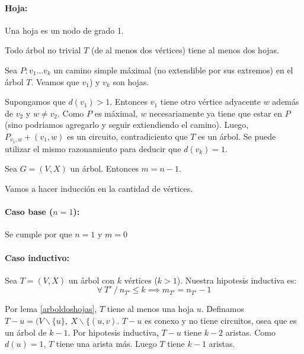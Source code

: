 \paragraph{Hoja:} Una hoja es un nodo de grado 1.

\begin{lema}\label{arboldoshojas}
	Todo árbol no trivial \(T\) (de al menos dos vértices) tiene al menos dos hojas.
\end{lema}
\begin{demo}
	Sea \(P: v_1\dots v_k\) un camino simple máximal (no extendible por sus extremos) en el árbol \(T\). Veamos que \(v_1\)) y \(v_k\) son hojas. 	
	
	Supongamos que \(d(v_1) > 1\). Entonces \(v_1\) tiene otro vértice adyacente
	 \(w\) además de \(v_2\) y \(w \neq v_2\). Como \(P\) es máximal, \(w\)
	  necesariamente ya tiene que estar en \(P\) (sino podriamos agregarlo y seguir extiendiendo el
	 camino).
	 Luego, \(P_{v_1,w} + (v_1, w)\) es un circuito, contradiciento que \(T\) es un árbol.
	Se puede utilizar el mismo razonamiento para deducir que \(d(v_k) = 1\).
\end{demo}

\begin{lema}\label{arbolcantEjes}
	Sea \(G = (V, X)\) un árbol. Entonces \(m = n - 1\).
\end{lema}
\begin{demo}
	Vamos a hacer inducción en la cantidad de vértices.
	\paragraph{Caso base (\(n = 1\)):} Se cumple por que \(n = 1\) y \(m = 0\)
	\paragraph{Caso inductivo:} Sea \(T = (V, X)\) un árbol con \(k\) vértices (\(k > 1\)). Nuestra hipotesis inductiva es: \[\forall~T' ~/~ n_{T'} \leq k \implies m_{T'} = n_{T'} - 1\]
	
	
	Por lema \ref{arboldoshojas}, \(T\) tiene al menos una hoja \(u\). Definamos \(T - u = (V \backslash \{u\},~X\backslash \{(u,v)\). \(T - u\) es conexo y no tiene circuitos, osea que es un árbol de \(k-1\). Por hipotesis inductiva, \(T - u\) tiene \(k-2\) aristas. Como \(d(u) = 1\), \(T\) tiene una arista más. Luego \(T\) tiene \(k-1\) aristas.
\end{demo}

